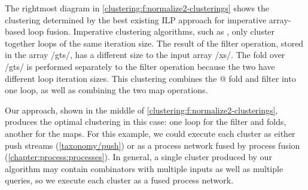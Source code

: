 The rightmost diagram in \cref{clustering:f:normalize2-clusterings} shows the clustering determined by the best existing ILP approach for imperative array-based loop fusion.
Imperative clustering algorithms, such as \citet{megiddo1998optimal}, only cluster together loops of the same iteration size.
The result of the filter operation, stored in the array \Hs/gts/, has a different size to the input array \Hs/xs/.
The fold over \Hs/gts/ is performed separately to the filter operation because the two have different loop iteration sizes.
This clustering combines the @ fold and \Hs@gts@ filter into one loop, as well as combining the two map operations.

Our approach, shown in the middle of \cref{clustering:f:normalize2-clusterings}, produces the optimal clustering in this case: one loop for the filter and folds, another for the maps.
For this example, we could execute each cluster as either push streams (\cref{taxonomy/push}) or as a process network fused by process fusion (\cref{chapter:process:processes}).
In general, a single cluster produced by our algorithm may contain combinators with multiple inputs as well as multiple queries, so we execute each cluster as a fused process network.


